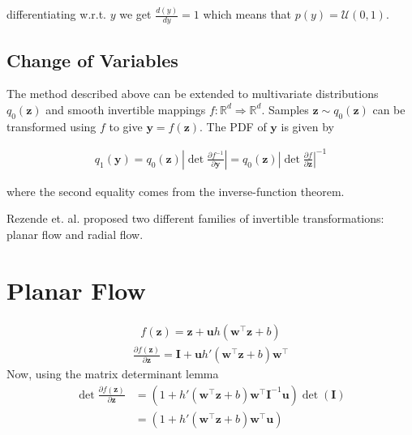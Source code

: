 \documentclass[]{article}
\begin{document}
differentiating w.r.t. $y$ we get $\frac{d(y)}{dy} = 1$ which means that $p(y) = \mathcal{U}(0,1)$.

\subsection{Change of Variables}

The method described above can be extended to multivariate distributions $q_0(\mathbf{z})$ and smooth invertible mappings $f: \mathbb{R}^d\Rightarrow\mathbb{R}^d$. Samples $\mathbf{z} \sim q_0(\mathbf{z})$ can be transformed using $f$ to give $\mathbf{y}=f(\mathbf{z})$. The PDF of $\mathbf{y}$ is given by 

\begin{align}
q_1(\mathbf{y}) = q_0(\mathbf{z})\left|\det \frac{\partial f^{-1}}{\partial \mathbf{y}}\right| = q_0(\mathbf{z})\left|\det \frac{\partial f}{\partial \mathbf{z}}\right|^{-1}
\end{align}

where the second equality comes from the inverse-function theorem.

Rezende et. al. proposed two different families of invertible transformations: planar flow and radial flow.

\section{Planar Flow}
\begin{align*}
	f(\mathbf{z}) = \mathbf{z} + \mathbf{u}h(\mathbf{w}^\top\mathbf{z} + b)
\end{align*}
\begin{align*}
	\frac{\partial f(\mathbf{z})}{\partial \mathbf{z}} = \mathbf{I} + \mathbf{u}h'(\mathbf{w}^\top\mathbf{z} + b)\mathbf{w}^\top
\end{align*}
Now, using the matrix determinant lemma
\begin{align*}
\det\frac{\partial f(\mathbf{z})}{\partial \mathbf{z}} &= (1 + h'(\mathbf{w}^\top\mathbf{z} + b)\mathbf{w}^\top\mathbf{I}^{-1}\mathbf{u})\det(\mathbf{I})\\
&=(1 + h'(\mathbf{w}^\top\mathbf{z} + b)\mathbf{w}^\top\mathbf{u})
\end{align*}
\end{document}
